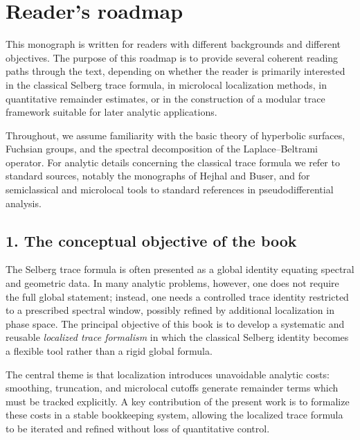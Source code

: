 
\chapter*{Reader's roadmap}

\noindent
This monograph is written for readers with different backgrounds and different objectives.
The purpose of this roadmap is to provide several coherent reading paths through the text, depending on whether the reader is primarily interested in the classical Selberg trace formula, in microlocal localization methods, in quantitative remainder estimates, or in the construction of a modular trace framework suitable for later analytic applications.

\medskip

\noindent
Throughout, we assume familiarity with the basic theory of hyperbolic surfaces, Fuchsian groups, and the spectral decomposition of the Laplace--Beltrami operator.
For analytic details concerning the classical trace formula we refer to standard sources, notably the monographs of Hejhal and Buser, and for semiclassical and microlocal tools to standard references in pseudodifferential analysis.

\section*{1. The conceptual objective of the book}

\noindent
The Selberg trace formula is often presented as a global identity equating spectral and geometric data.
In many analytic problems, however, one does not require the full global statement; instead, one needs a controlled trace identity restricted to a prescribed spectral window, possibly refined by additional localization in phase space.
The principal objective of this book is to develop a systematic and reusable \emph{localized trace formalism} in which the classical Selberg identity becomes a flexible tool rather than a rigid global formula.

\medskip

\noindent
The central theme is that localization introduces unavoidable analytic costs:
smoothing, truncation, and microlocal cutoffs generate remainder terms which must be tracked explicitly.
A key contribution of the present work is to formalize these costs in a stable bookkeeping system, allowing the localized trace formula to be iterated and refined without loss of quantitative control.

